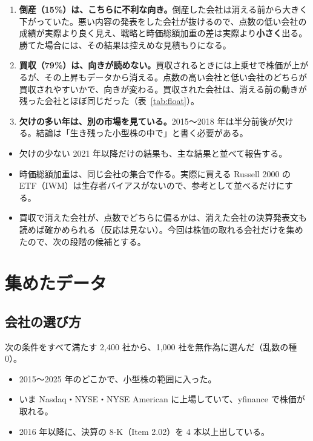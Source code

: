 \documentclass[xelatex,ja=standard,jafont=haranoaji,a4paper,10pt,openany]{bxjsreport}
\newcommand{\tabref}[1]{表~\ref{#1}}
\begin{document}
\begin{enumerate}
\item \textbf{倒産（15\%）は、こちらに不利な向き。}倒産した会社は消える前から大きく下がっていた。悪い内容の発表をした会社が抜けるので、点数の低い会社の成績が実際より良く見え、戦略と時価総額加重の差は実際より\textbf{小さく}出る。勝てた場合には、その結果は控えめな見積もりになる。
\item \textbf{買収（79\%）は、向きが読めない。}買収されるときには上乗せで株価が上がるが、その上昇もデータから消える。点数の高い会社と低い会社のどちらが買収されやすいかで、向きが変わる。買収された会社は、消える前の動きが残った会社とほぼ同じだった（\tabref{tab:float}）。
\item \textbf{欠けの多い年は、別の市場を見ている。}2015〜2018 年は半分前後が欠ける。結論は「生き残った小型株の中で」と書く必要がある。
\end{enumerate}

\begin{notebox}[実験のときに決めておくこと]
\begin{itemize}
\item 欠けの少ない 2021 年以降だけの結果も、主な結果と並べて報告する。
\item 時価総額加重は、同じ会社の集合で作る。実際に買える Russell 2000 の ETF（IWM）は生存者バイアスがないので、参考として並べるだけにする。
\item 買収で消えた会社が、点数でどちらに偏るかは、消えた会社の決算発表文も読めば確かめられる（反応は見ない）。今回は株価の取れる会社だけを集めたので、次の段階の候補とする。
\end{itemize}
\end{notebox}

\chapter{集めたデータ}\label{ch:data}

\section{会社の選び方}

次の条件をすべて満たす 2,400 社から、1,000 社を無作為に選んだ（乱数の種 0）。

\begin{itemize}
\item 2015〜2025 年のどこかで、小型株の範囲に入った。
\item いま Nasdaq・NYSE・NYSE American に上場していて、yfinance で株価が取れる。
\item 2016 年以降に、決算の 8-K（Item 2.02）を 4 本以上出している。
\end{itemize}
\end{document}
